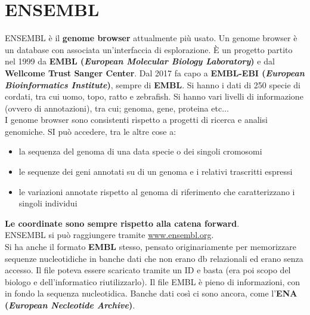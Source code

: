 \documentclass[a4paper,12pt, oneside]{book}
\begin{document}
\section{ENSEMBL}
ENSEMBL è il \textbf{genome browser} attualmente più usato. Un genome browser è
un database con associata un'interfaccia di esplorazione. È un progetto partito
nel 1999 da \textbf{EMBL (\textit{European Molecular Biology Laboratory})} e dal
\textbf{Wellcome Trust Sanger Center}. Dal 2017 fa capo a 
\textbf{EMBL-EBI (\textit{European Bioinformatics Institute})}, sempre di
\textbf{EMBL}. Si hanno i dati di 250 specie di cordati, tra cui uomo, topo,
ratto e 
zebrafish. Si hanno vari livelli di informazione (ovvero di annotazioni), tra
cui; genoma, gene, proteina etc$\ldots$\\
I genome browser sono consistenti rispetto a progetti di ricerca e
analisi genomiche. SI può accedere, tra le altre cose a:
\begin{itemize}
  \item la sequenza del genoma di una data specie o dei singoli cromosomi
  \item le sequenze dei geni annotati su di un genoma e i relativi trascritti
  espressi
  \item le variazioni annotate rispetto al genoma di riferimento che
  caratterizzano i singoli individui  
\end{itemize}
\textbf{Le coordinate sono sempre rispetto alla catena forward}.\\
ENSEMBL si può raggiungere tramite \url{www.ensembl.org}.\\
Si ha anche il formato \textbf{EMBL} stesso, pensato originariamente per
memorizzare sequenze 
nucleotidiche in banche dati che non erano db relazionali ed erano senza
accesso. Il file poteva essere scaricato tramite un ID e basta (era poi scopo
del biologo e dell'informatico riutilizzarlo). Il file EMBL è pieno di
informazioni, con in fondo la sequenza nucleotidica. Banche dati così ci sono
ancora, come l'\textbf{ENA (\textit{European Necleotide Archive})}.
\end{document}

